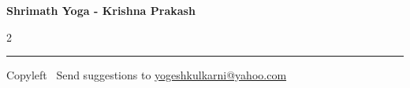 \documentclass[9pt,a4paper,landscape]{article}
\begin{document}
\footnotesize


\begin{center}
\Large{\textbf{Shrimath Yoga - Krishna Prakash}} 
\end{center}

\begin{multicols}{2}

\end{multicols}

\rule{\linewidth}{0.25pt}
\scriptsize
Copyleft \textcopyleft\  Send suggestions to 
\href{http://www.yogeshkulkarni.com}{yogeshkulkarni@yahoo.com}
\end{document}
